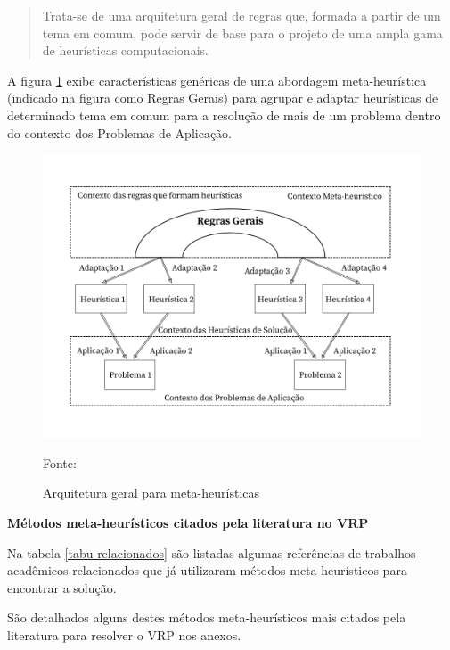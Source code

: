 \begin{quote}
Trata-se de uma arquitetura geral de regras que, formada a partir de um tema em comum, pode servir de base para o projeto de uma ampla gama de heurísticas computacionais.
\end{quote}

A figura \ref{heuristica-goldbarg} exibe características genéricas de uma abordagem meta-heurística (indicado na figura como Regras Gerais) para agrupar e adaptar heurísticas de determinado tema em comum para a resolução de mais de um problema dentro do contexto dos Problemas de Aplicação.

\begin{figure}[H]
  \centering
  \caption{Arquitetura geral para meta-heurísticas}
 \includegraphics[scale=0.4]{imagens/metaheuristica.png} \par
\bigskip
\label{heuristica-goldbarg}
    Fonte: \cite[p. 75]{goldbarg}
\end{figure}

\textbf{Métodos meta-heurísticos citados pela literatura no VRP} \par
Na tabela \ref{tabu-relacionados} são listadas algumas referências de trabalhos acadêmicos relacionados que já utilizaram métodos meta-heurísticos para encontrar a solução.



São detalhados alguns destes métodos meta-heurísticos mais citados pela literatura para resolver o VRP nos anexos.



